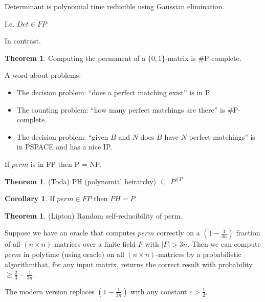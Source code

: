 \documentclass[a4paper,12pt]{article}
\theoremstyle{definition}
\newtheorem{theorem}[counter]{Theorem}
\newtheorem{corollary}[counter]{Corollary}
\theoremstyle{remark}
\begin{document}
Determinant is polynomial time reducible using Gaussian elimination.

I.e. $Det \in FP$

In contrast.

\begin{theorem}
    Computing the permanent of a $\{0, 1\}$-matrix is $\#$P-complete.
\end{theorem}

A word about problems:
\begin{itemize}
    \item The decision problem: ``does a perfect matching exist'' is in P.
    \item The counting problem: ``how many perfect matchings are there'' is $\#$P-complete.
    \item The decision problem: ``given $B$ and $N$ does $B$ have $N$ perfect matchings'' is in PSPACE and has a nice IP.
\end{itemize}

If $perm$ is in FP then P = NP.

\begin{theorem}
    (Toda)
    PH (polynomial heirarchy) $\subseteq$ $P^{\#P}$
\end{theorem}

\begin{corollary}
    If $perm \in FP$ then $PH = P$.
\end{corollary}

\begin{theorem}
    (Lipton)
    Random self-reducibility of perm.

    Suppose we have an oracle that computes $perm$ correctly on a $(1 - \frac{1}{3n})$ 
    fraction of all $(n \times n)$ matrices over a finite field $F$ with $|F| > 3n$.
    Then we can compute $perm$ in polytime (using oracle) on all $(n \times n)$-matrices 
    by a probabilistic algorithmthat, for any input matrix, returns the correct result with 
    probability $\geq \frac{2}{3} - \frac{1}{3n}$.
\end{theorem}

The modern version replaces $(1 - \frac{1}{3n})$  with any constant $c > \frac{1}{2}$.
\end{document}

